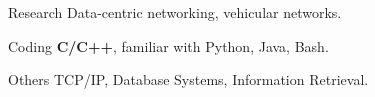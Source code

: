 
\begin{cvskills}

  \cvskill
    {Research} %
    {Data-centric networking, vehicular networks.}


  \cvskill
    {Coding} %
    {\textbf{C/C++}, familiar with Python, Java, Bash.} %


 \cvskill
   {Others} %
   {TCP/IP, Database Systems, Information Retrieval.}%

\end{cvskills}
